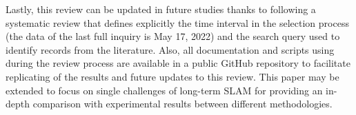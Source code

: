 Lastly, this review can be updated in future studies thanks to following a systematic review that defines explicitly the time interval in the selection process (the data of the last full inquiry is May 17, 2022) and the search query used to identify records from the literature.
Also, all documentation and scripts using during the review process are available in a public GitHub repository to facilitate replicating of the results and future updates to this review.
This paper may be extended to focus on single challenges of long-term SLAM for providing an in-depth comparison with experimental results between different methodologies.
